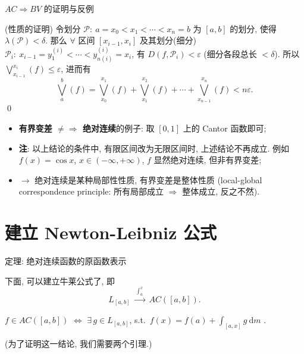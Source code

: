 
\begin{frame}{$AC \Longrightarrow BV$ 的证明与反例}

\startproof[bg=yellow, fg=red](性质的证明)
令划分 $\mathscr{P}:\ a = x_0 < x_1 < \cdots < x_n = b$ 为 $[a, b]$ 的划分,
使得 $\lambda(\mathscr{P}) < \delta$.
那么 $\forall$ 区间 $[x_{i-1}, x_i]$ 及其划分(细分)
$\mathscr{P}_i:\ x_{i-1} = y_1^{(i)} < \cdots < y_{n(i)}^{(i)} = x_i$, 有
$D(f, \mathscr{P}_i) < \varepsilon$ (细分各段总长 $< \delta$).
所以 $\bigvee_{x_{i-1}}^{x_i} (f) \leqslant \varepsilon$, 进而有
\[
\bigvee_a^b (f)
= \bigvee_{x_0}^{x_1} (f) + \bigvee_{x_1}^{x_2} (f) + \cdots + \bigvee_{x_{n-1}}^{x_n} (f)
< n \varepsilon .
\]
\qed

\pause

\begin{itemize}
\item \textbf{有界变差 $\neq\!\!\Rightarrow$ 绝对连续}的例子:
  取 $[0, 1]$ 上的 Cantor 函数即可;
\item \textbf{注}: 以上结论的条件中, 有限区间改为无限区间时, 上述结论不再成立.
  例如 $f(x) = \cos x$, $x \in (-\infty, +\infty)$, $f$ 显然绝对连续, 但非有界变差;
\graymode
\item $\longrightarrow$ \alert{绝对连续是某种局部性性质, 有界变差是整体性质}
  (local-global correspondence principle: 所有局部成立 $\Rightarrow$ 整体成立,
  反之不然).
\normalmode
\end{itemize}

\end{frame}


\section[NL 公式]{建立 Newton-Leibniz 公式}


\begin{frame}{定理: 绝对连续函数的原函数表示}

下面, 可以建立牛莱公式了, 即
\[
L_{[a, b]} \;\xrightarrow{\ \int_a^x\ }\; AC([a, b]) .
\]

\begin{thm}
$f \in AC([a, b])$
$\Longleftrightarrow$
$\exists\, g \in L_{[a, b]}$, s.t.\
$f(x) = f(a) + \int_{[a, x]} g ~ \mathrm{d} m$ .
\end{thm}

\pause

(为了证明这一结论, 我们需要两个引理.)

\end{frame}

